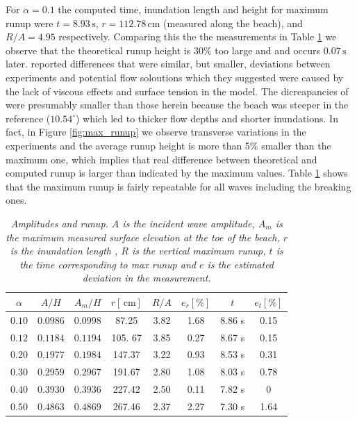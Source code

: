 \documentclass[review, authoryear]{elsarticle}
\newcommand{\s}{\,\mbox{s}}
\newcommand{\cm}{\,\mbox{cm}}
\begin{document}
For $\alpha=0.1$ the computed time, inundation length and height for  
maximum runup  
were $t=8.93\s$, $r=112.78\cm$ (measured along the beach), and $R/A=4.95$ 
respectively. 
Comparing this the the measurements in Table \ref{tab:max_shore} we observe that the theoretical runup height is  30\%  too large and and occurs $0.07\s$ later.   \cite{pedersen2013runup} reported differences that were similar, but smaller, deviations
between experiments and potential flow soloutions which they suggested were caused by the lack of viscous effects and surface tension in the model. The dicreapancies of  \cite{pedersen2013runup} were presumably smaller than those herein because the 
beach was steeper in the reference ($10.54 ^\circ$) which led to thicker flow depths and shorter inundations. 
In fact, in Figure \ref{fig:max_runup} we observe transverse variations in the experiments and the average
runup height is more than 5\% smaller than the maximum one, which implies that real difference between theoretical and computed
runup is larger than indicated by the maximum values. Table \ref{tab:max_shore} shows that the maximum runup is fairly repeatable for all waves including the breaking ones. %

\begin{table}[]
\caption{\textit{Amplitudes and runup. $A$ is  the incident wave amplitude, $A_m$ is the maximum measured surface elevation at the toe of the beach, $r$ is the inundation length , $R$ is the vertical maximum runup, $t$ is the time corresponding to max runup and $e$ is the estimated deviation in the measurement.}}
\centering
\begin{tabular}{cccccccc}
\hline
      $\alpha$&  $A/H$&   $A_m/H$&  $r [\cm]$ &$R/A$ & $e_r [\%]$ & $t$ & $e_t [\%]$ \\ \hline
\textit{$0.10$} &\textit{$0.0986$}  &\textit{$0.0998$}  & 87.25    &    3.82  & 1.68             & 8.86 s        & 0.15              \\
\textit{$0.12$}  &\textit{$0.1184$}  &\textit{$0.1194$}  & 105. 67   &    3.85   & 0.27             & 8.67 s        & 0.15               \\
\textit{$0.20$}  &\textit{$0.1977$}  &\textit{$0.1984$} & 147.37    &    3.22  & 0.93            & 8.53 s        & 0.31                \\
\textit{$0.30$}  &\textit{$0.2959$}  &\textit{$0.2967$}  & 191.67     &   2.80  & 1.08           & 8.03 s        & 0.78              \\
\textit{$0.40$}  &\textit{$0.3930$}  &\textit{$0.3936$}  & 227.42      &   2.50 & 0.11            & 7.82 s        & 0              \\
\textit{$0.50$}  &\textit{$0.4863$}  &\textit{$0.4869$}  & 267.46       &    2.37 & 2.27            & 7.30 s        & 1.64              
\end{tabular}
\label{tab:max_shore}
\end{table}
\end{document}
